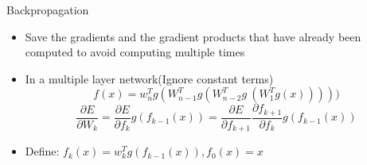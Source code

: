 \documentclass[12pt,notes,mathserif]{beamer}
\providecommand{\tightlist}{%
	\setlength{\itemsep}{0pt}\setlength{\parskip}{0pt}}
\begin{document}
\begin{frame}{Backpropagation}

\begin{itemize}
\tightlist
\item
  Save the gradients and the gradient products that have already been
  computed to avoid computing multiple times
\item
  In a multiple layer network(Ignore constant terms)\\
  \[f(x)=w_{n}^{T}g (W_{n-1}^{T}g(W_{n-2}^{T}g\ (W_{1}^{T}g(x)))))\] \[
      \frac{\partial E}{\partial W_{k}}=\frac{\partial E}{\partial f_{k}}g(f_{k-1}(x))
      =\frac{\partial E}{\partial f_{k+1}}\frac{\partial f_{k+1}}{\partial f_{k}}g(f_{k-1}(x))
      \]
\item
  Define: \(f_{k}(x)=w_{k}^{T}g(f_{k-1}(x)), f_{0}(x)=x\)
\end{itemize}

\end{frame}
\end{document}
